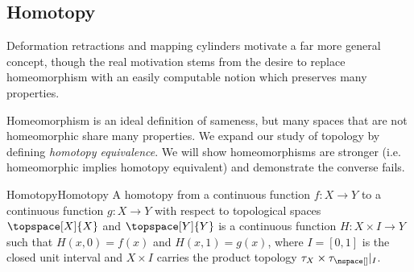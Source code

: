 \documentclass{book}                                                           %
\begin{document}
            \subsection{Homotopy}
                Deformation retractions and mapping cylinders motivate a far
                more general concept, though the real motivation stems from the
                desire to replace homeomorphism with an easily computable
                notion which preserves many properties.
                \par\hfill\par
                \begin{minipage}[t]{0.50\textwidth}
                    Homeomorphism is an ideal definition of sameness, but many
                    spaces that are not homeomorphic share many properties. We
                    expand our study of topology by defining
                    \textit{homotopy equivalence}. We will show homeomorphisms
                    are stronger (i.e. homeomorphic implies homotopy
                    equivalent) and demonstrate the converse fails.
                \end{minipage}
                \hfill
                \par\vspace{2.5ex}
                \begin{fdefinition}{Homotopy}{Homotopy}
                    A homotopy from a continuous function $f:X\rightarrow{Y}$ to
                    a continuous function $g:X\rightarrow{Y}$ with respect to
                    topological spaces $\topspace[X]{X}$ and $\topspace[Y]{Y}$
                    is a continuous function $H:{X}\times{I}\rightarrow{Y}$ such
                    that $H(x,0)=f(x)$ and $H(x,1)=g(x)$, where $I=[0,1]$ is the
                    closed unit interval and $X\times{I}$ carries the product
                    topology $\tau_{X}\times\tau_{\nspace[]}|_{I}$.
                \end{fdefinition}
\end{document}
